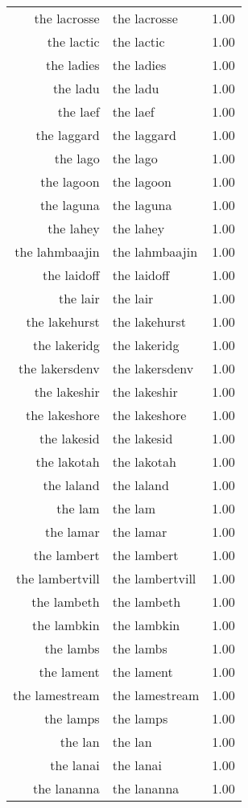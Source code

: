 \begin{table}[ht]
\begin{tabular}{rlr}
  the lacrosse & the lacrosse & 1.00 \\ 
  the lactic & the lactic & 1.00 \\ 
  the ladies & the ladies & 1.00 \\ 
  the ladu & the ladu & 1.00 \\ 
  the laef & the laef & 1.00 \\ 
  the laggard & the laggard & 1.00 \\ 
  the lago & the lago & 1.00 \\ 
  the lagoon & the lagoon & 1.00 \\ 
  the laguna & the laguna & 1.00 \\ 
  the lahey & the lahey & 1.00 \\ 
  the lahmbaajin & the lahmbaajin & 1.00 \\ 
  the laidoff & the laidoff & 1.00 \\ 
  the lair & the lair & 1.00 \\ 
  the lakehurst & the lakehurst & 1.00 \\ 
  the lakeridg & the lakeridg & 1.00 \\ 
  the lakersdenv & the lakersdenv & 1.00 \\ 
  the lakeshir & the lakeshir & 1.00 \\ 
  the lakeshore & the lakeshore & 1.00 \\ 
  the lakesid & the lakesid & 1.00 \\ 
  the lakotah & the lakotah & 1.00 \\ 
  the laland & the laland & 1.00 \\ 
  the lam & the lam & 1.00 \\ 
  the lamar & the lamar & 1.00 \\ 
  the lambert & the lambert & 1.00 \\ 
  the lambertvill & the lambertvill & 1.00 \\ 
  the lambeth & the lambeth & 1.00 \\ 
  the lambkin & the lambkin & 1.00 \\ 
  the lambs & the lambs & 1.00 \\ 
  the lament & the lament & 1.00 \\ 
  the lamestream & the lamestream & 1.00 \\ 
  the lamps & the lamps & 1.00 \\ 
  the lan & the lan & 1.00 \\ 
  the lanai & the lanai & 1.00 \\ 
  the lananna & the lananna & 1.00 \\ 

\end{tabular}
\end{table}
